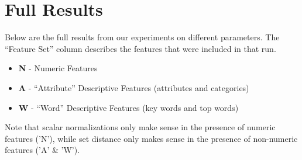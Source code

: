 \documentclass{article}
\begin{document}
\section{Full Results}
\label{appendix:full-results}

Below are the full results from our experiments on different parameters.
The ``Feature Set'' column describes the features that were included in that run.
\begin{itemize}
	\item \textbf{N} - Numeric Features
	\item \textbf{A} - ``Attribute'' Descriptive Features (attributes and categories)
	\item \textbf{W} - ``Word'' Descriptive Features (key words and top words)
\end{itemize}

Note that scalar normalizations only make sense in the presence of numeric features ('N'),
while set distance only makes sense in the presence of non-numeric features ('A' \& 'W').
\end{document}
